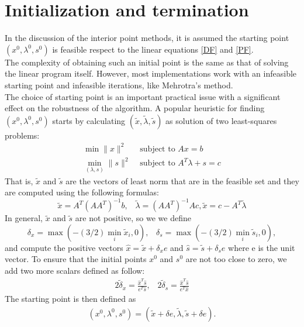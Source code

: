 \documentclass[a4paper,10 pt,titlepage,twoside]{book}
\theoremstyle{plain}
\theoremstyle{definition}
\theoremstyle{remark}
\begin{document}
\section*{Initialization and termination}
In the discussion of the interior point methods, it is assumed the starting point $(x^{0}, \lambda^{0}, s^{0})$ is feasible respect to the linear equations \ref{DF} and \ref{PF}.\\
 The complexity of obtaining such an initial point is the same as that of solving the
linear program itself. However, most implementations work with an infeasible starting point and infeasible iterations, like Mehrotra's method.\\
The choice of starting point is an important practical issue with a significant effect on the robustness of the algorithm. A popular heuristic for finding $(x^{0}, \lambda^{0}, s^{0})$ starts by calculating $(\tilde{x}, \tilde{\lambda}, \tilde{s})$ as solution of two least-squares problems:
\begin{align*}
\min \lVert x \rVert ^{2} &\text{ subject to }Ax = b\\
	 \min\limits_{(\lambda,s)} \lVert s \rVert ^{2} &\text{ subject to } A^{T}\lambda +s = c
\end{align*}
That is, $\tilde{x}$ and $\tilde{s}$ are the vectors of least norm that are in the feasible set and they are computed using the following formulas:
\begin{equation*}
\tilde{x} = A^{T}(AA^{T})^{-1}b,\;\;\;\tilde{\lambda}=(AA^{T})^{-1}Ac, \tilde{x} = c- A^{T}\tilde{\lambda}
\end{equation*}
In general, $\tilde{x}$ and $\tilde{s}$ are not positive, so we we define
\begin{equation*}
\delta_{x} = \max(-(3/2)\min\limits_{i}\tilde{x}_{i},0),\;\;\; \delta_{s} = \max(-(3/2)\min\limits_{i}\tilde{s}_{i},0),
\end{equation*}
and compute the positive vectors $\hat{x}= \tilde{x}+\delta_{x}e$ and $\hat{s}= \tilde{s}+\delta_{s}e$ where e is the unit vector. To ensure that the initial points $x^{0}$ and $s^{0}$ are not too close to zero, we add two more scalars defined as follow:
\begin{align*}
2\tilde{\delta}_{x}= \frac{\hat{x}^{T}\hat{s}}{e^{T}\hat{s}},\;\;\;2\tilde{\delta}_{s} = \frac{\hat{x}^{T}\hat{s}}{e^{T}\hat{x}}
\end{align*}
The starting point is then defined as 
\begin{align*}
(x^{0}, \lambda^{0}, s^{0}) = (\tilde{x}+\delta e,\tilde{\lambda},\tilde{s}+\delta e).
\end{align*}
\end{document}
